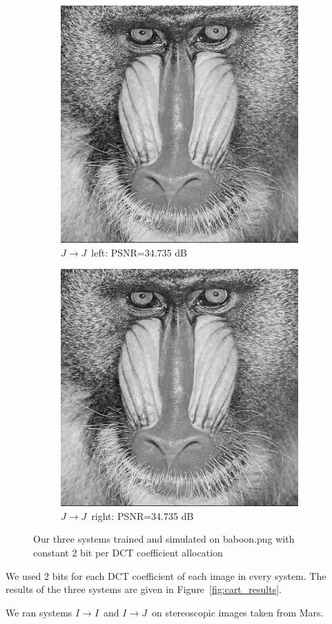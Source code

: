 \documentclass[10pt,twoside,titlepage]{article}
\newcommand{\sysII}{\mbox{$I \rightarrow I$}}
\newcommand{\sysIJ}{\mbox{$I \rightarrow J$}}
\newcommand{\sysJJ}{\mbox{$J \rightarrow J$}}
\begin{document}
\begin{figure}
    \centering
    \begin{subfigure}{0.5\textwidth}
        \centering
        \includegraphics[width=0.6\linewidth]{img/baboon_jj_left.png}
        \caption{\sysJJ\ left: PSNR=34.735 dB}
    \end{subfigure}%
    \begin{subfigure}{0.5\textwidth}
        \centering
        \includegraphics[width=0.6\linewidth]{img/baboon_jj_right.png}
        \caption{\sysJJ\ right: PSNR=34.735 dB}
    \end{subfigure}
    \caption{Our three systems trained and simulated on baboon.png with constant 2 bit per DCT coefficient allocation}
    \label{fig:baboon_results}
\end{figure}

We used 2 bits for each DCT coefficient of each image in every system.  The results of the three systems are given in Figure~\ref{fig:cart_results}.

We ran systems \sysII\ and \sysIJ\ on stereoscopic images taken from Mars.
\end{document}
